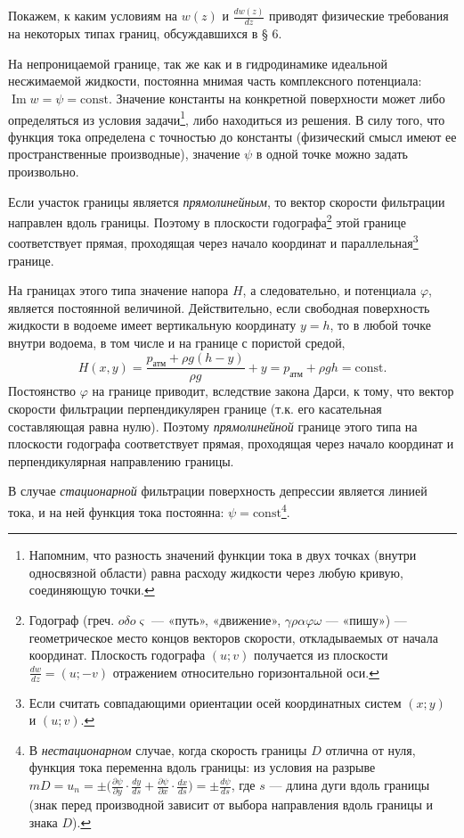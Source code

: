 Покажем, к каким условиям на $w(z)$ и $\frac{dw(z)}{dz}$ приводят физические требования на некоторых типах границ, обсуждавшихся в § 6.

\setcounter{footnote}{0}
На непроницаемой границе, так же как и в гидродинамике идеальной несжимаемой жидкости, постоянна мнимая часть комплексного потенциала: $\operatorname{Im}w=\psi=\mathrm{const}$. Значение константы на конкретной поверхности может либо определяться из условия задачи\footnote{Напомним, что разность значений функции тока в двух точках (внутри односвязной области) равна расходу жидкости через любую кривую, соединяющую точки.}, либо находиться из решения. В силу того, что функция тока определена с точностью до константы (физический смысл имеют ее пространственные производные), значение $\psi$ в одной точке можно задать произвольно.

Если участок границы является \textit{прямолинейным}, то вектор скорости фильтрации направлен вдоль границы. Поэтому в плоскости годографа\footnote{Годограф (греч. $o\delta o\varsigma$ --- «путь», «движение», $\gamma\rho\alpha\varphi\omega$ --- «пишу») --- геометрическое место концов векторов скорости, откладываемых от начала координат. Плоскость годографа $(u;v)$ получается из плоскости $\frac{dw}{dz}=(u;-v)$ отражением относительно горизонтальной оси.} этой границе соответствует прямая, проходящая через начало координат и параллельная\footnote{Если считать совпадающими ориентации осей координатных систем $(x;y)$ и $(u;v)$.} границе.

На границах этого типа значение напора $H$, а следовательно, и потенциала $\varphi$, является постоянной величиной. Действительно, если свободная поверхность жидкости в водоеме имеет вертикальную координату $y=h$, то в любой точке внутри водоема, в том числе и на границе с пористой средой,
\[
H(x,y)=\frac{p_{\text{атм}}+\rho g(h-y)}{\rho g}+y=p_{\text{атм}}+\rho gh=\mathrm{const}.
\]
Постоянство $\varphi$ на границе приводит, вследствие закона Дарси,
к тому, что вектор скорости фильтрации перпендикулярен границе (т.к. его касательная составляющая равна нулю). Поэтому \textit{прямолинейной} границе этого типа на плоскости годографа соответствует прямая, проходящая через начало координат и перпендикулярная направлению границы.

В случае \textit{стационарной} фильтрации поверхность депрессии является линией тока, и на ней функция тока постоянна: $\psi=\mathrm{const}$\setcounter{footnote}{0}\footnote{В \textit{нестационарном} случае, когда скорость границы $D$ отлична от нуля, функция тока переменна вдоль границы: из условия на разрыве $mD=u_n=\pm\bigl(\frac{\partial\psi}{\partial y}\cdot\frac{dy}{ds}+\frac{\partial\psi}{\partial x}\cdot\frac{dx}{ds}\bigr)=\pm\frac{d\psi}{ds}$, где $s$ --- длина дуги вдоль границы (знак перед производной зависит от выбора направления вдоль границы и знака $D$).}.


